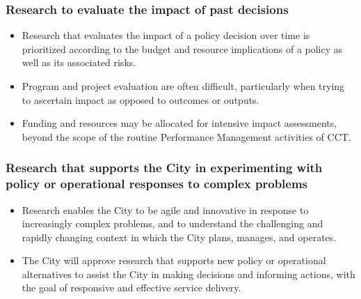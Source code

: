 \documentclass[
]{book}
\providecommand{\tightlist}{%
  \setlength{\itemsep}{0pt}\setlength{\parskip}{0pt}}
\begin{document}
\hypertarget{research-to-evaluate-the-impact-of-past-decisions}{%
\subsubsection*{Research to evaluate the impact of past decisions}\label{research-to-evaluate-the-impact-of-past-decisions}}

\begin{itemize}
\tightlist
\item
  Research that evaluates the impact of a policy decision over time is prioritized according to the budget and resource implications of a policy as well as its associated risks.
\item
  Program and project evaluation are often difficult, particularly when trying to ascertain impact as opposed to outcomes or outputs.
\item
  Funding and resources may be allocated for intensive impact assessments, beyond the scope of the routine Performance Management activities of CCT.
\end{itemize}

\hypertarget{research-that-supports-the-city-in-experimenting-with-policy-or-operational-responses-to-complex-problems}{%
\subsubsection*{Research that supports the City in experimenting with policy or operational responses to complex problems}\label{research-that-supports-the-city-in-experimenting-with-policy-or-operational-responses-to-complex-problems}}

\begin{itemize}
\tightlist
\item
  Research enables the City to be agile and innovative in response to increasingly complex problems, and to understand the challenging and rapidly changing context in which the City plans, manages, and operates.
\item
  The City will approve research that supports new policy or operational alternatives to assist the City in making decisions and informing actions, with the goal of responsive and effective service delivery.
\end{itemize}
\end{document}
